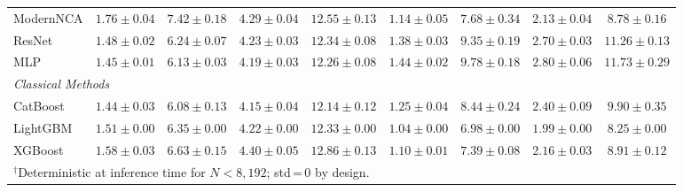 \begin{table}[t]
{\begin{tabular}{lcccccccc}
ModernNCA & $1.76 \pm 0.04$ & $7.42 \pm 0.18$ & $4.29 \pm 0.04$ & $12.55 \pm 0.13$ & $1.14 \pm 0.05$ & $7.68 \pm 0.34$ & $2.13 \pm 0.04$ & $8.78 \pm 0.16$ \\
ResNet & $1.48 \pm 0.02$ & $6.24 \pm 0.07$ & $4.23 \pm 0.03$ & $12.34 \pm 0.08$ & $1.38 \pm 0.03$ & $9.35 \pm 0.19$ & $2.70 \pm 0.03$ & $11.26 \pm 0.13$ \\
MLP & $1.45 \pm 0.01$ & $6.13 \pm 0.03$ & $4.19 \pm 0.03$ & $12.26 \pm 0.08$ & $1.44 \pm 0.02$ & $9.78 \pm 0.18$ & $2.80 \pm 0.06$ & $11.73 \pm 0.29$ \\
\midrule
\multicolumn{9}{l}{\textit{Classical Methods}} \\
CatBoost & $1.44 \pm 0.03$ & $6.08 \pm 0.13$ & $4.15 \pm 0.04$ & $12.14 \pm 0.12$ & $1.25 \pm 0.04$ & $8.44 \pm 0.24$ & $2.40 \pm 0.09$ & $9.90 \pm 0.35$ \\
LightGBM & $1.51 \pm 0.00$ & $6.35 \pm 0.00$ & $4.22 \pm 0.00$ & $12.33 \pm 0.00$ & $1.04 \pm 0.00$ & $6.98 \pm 0.00$ & $1.99 \pm 0.00$ & $8.25 \pm 0.00$ \\
XGBoost & $1.58 \pm 0.03$ & $6.63 \pm 0.15$ & $4.40 \pm 0.05$ & $12.86 \pm 0.13$ & $1.10 \pm 0.01$ & $7.39 \pm 0.08$ & $2.16 \pm 0.03$ & $8.91 \pm 0.12$ \\
\bottomrule
\multicolumn{9}{l}{$^\dagger$Deterministic at inference time for $N<8{,}192$; std\,=\,0 by design.} \\
\end{tabular}}
\end{table}
